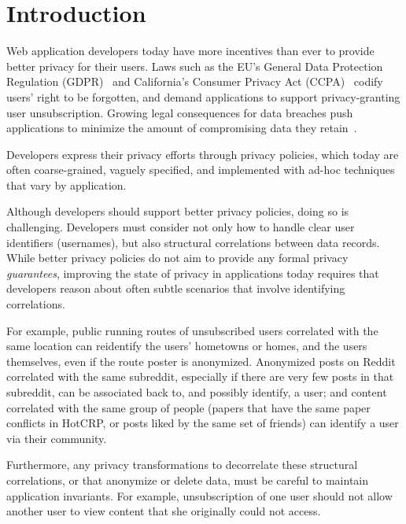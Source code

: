 \section{Introduction}
Web application developers today have more incentives than ever to provide better privacy for their
users.
%
Laws such as the EU's General Data Protection Regulation (GDPR)~\cite{eu:gdpr} and California's
Consumer Privacy Act (CCPA)~\cite{ca:privacy-act} codify users' right to be forgotten, and demand
applications to support privacy-granting user unsubscription.
%
Growing legal consequences for data breaches push applications to minimize the amount of
compromising data they retain~\cite{breach:amazon,breach:twitter, breach:fb, breach:marriott,
breach:quora}.

Developers express their privacy efforts through privacy policies, which today are often
coarse-grained, vaguely specified, and implemented with ad-hoc techniques that vary by application.

Although developers should support better privacy policies, doing so is challenging.  Developers
must consider not only how to handle clear user identifiers (\eg usernames), but also structural
correlations between data records.  While better privacy policies do not aim to provide any formal
privacy \emph{guarantees}, improving the state of privacy in applications today requires that
developers reason about often subtle scenarios that involve identifying correlations.

For example, public running routes of unsubscribed users correlated with the same location can
reidentify the users' hometowns or homes, and the users themselves, even if the route poster is
anonymized. Anonymized posts on Reddit correlated with the same subreddit, especially if there are
very few posts in that subreddit, can be associated back to, and possibly identify, a user; and
content correlated with the same group of people (\eg papers that have the same paper conflicts in
HotCRP, or posts liked by the same set of friends) can identify a user via their community.

Furthermore, any privacy transformations to decorrelate these structural correlations, or that
anonymize or delete data, must be careful to maintain application invariants. For example,
unsubscription of one user should not allow another user to view content that she originally could
not access.

